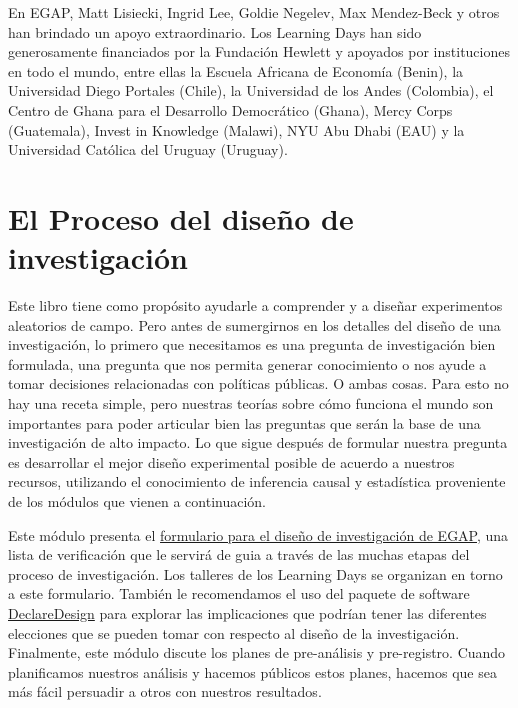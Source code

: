 \documentclass[
  12pt,
  spanish,
]{book}
\begin{document}
En EGAP, Matt Lisiecki, Ingrid Lee, Goldie Negelev, Max Mendez-Beck y otros han brindado un apoyo extraordinario. Los Learning Days han sido generosamente financiados por la Fundación Hewlett y apoyados por instituciones en todo el mundo, entre ellas la Escuela Africana de Economía (Benin), la Universidad Diego Portales (Chile), la Universidad de los Andes (Colombia), el Centro de Ghana para el Desarrollo Democrático (Ghana), Mercy Corps (Guatemala), Invest in Knowledge (Malawi), NYU Abu Dhabi (EAU) y la Universidad Católica del Uruguay (Uruguay).

\hypertarget{el-proceso-del-diseuxf1o-de-investigaciuxf3n}{%
\chapter{El Proceso del diseño de investigación}\label{el-proceso-del-diseuxf1o-de-investigaciuxf3n}}

Este libro tiene como propósito ayudarle a comprender y a diseñar experimentos aleatorios de campo. Pero antes de sumergirnos en los detalles del diseño de una investigación, lo primero que necesitamos es una pregunta de investigación bien formulada, una pregunta que nos permita generar conocimiento o nos ayude a tomar decisiones relacionadas con políticas públicas. O ambas cosas. Para esto no hay una receta simple, pero nuestras teorías sobre cómo funciona el mundo son importantes para poder articular bien las preguntas que serán la base de una investigación de alto impacto. Lo que sigue después de formular nuestra pregunta es desarrollar el mejor diseño experimental posible de acuerdo a nuestros recursos, utilizando el conocimiento de inferencia causal y estadística proveniente de los módulos que vienen a continuación.

Este módulo presenta el \href{https://egap.github.io/learningdays-resources/Exercises/design-form.Rmd}{formulario para el diseño de investigación de EGAP}, una lista de verificación que le servirá de guia a través de las muchas etapas del proceso de investigación. Los talleres de los Learning Days se organizan en torno a este formulario. También le recomendamos el uso del paquete de software \href{http://declaredesign.org}{DeclareDesign} para explorar las implicaciones que podrían tener las diferentes elecciones que se pueden tomar con respecto al diseño de la investigación. Finalmente, este módulo discute los planes de pre-análisis y pre-registro. Cuando planificamos nuestros análisis y hacemos públicos estos planes, hacemos que sea más fácil persuadir a otros con nuestros resultados.
\end{document}
